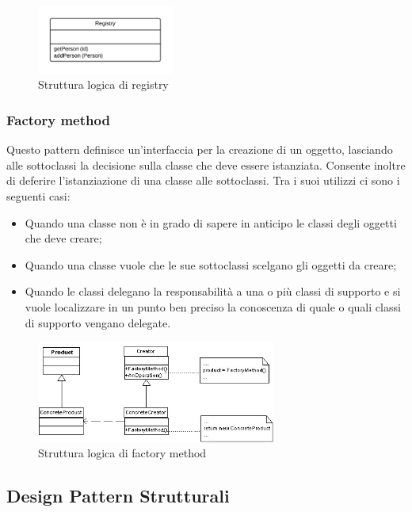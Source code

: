 \begin{figure}[h]
\centering \includegraphics[width=0.4\textwidth]{patterns/registry.png}
\caption{Struttura logica di registry}
\label{fig:factory-method}
\end{figure}

\subsubsection{Factory method}
	
Questo pattern definisce un'interfaccia per la creazione di un oggetto, lasciando alle sottoclassi la decisione sulla classe che deve essere istanziata. Consente inoltre di deferire l'istanziazione di una classe alle sottoclassi. Tra i suoi utilizzi ci sono i seguenti casi:

\begin{itemize}

	\item Quando una classe non è in grado di sapere in anticipo le classi degli oggetti che deve creare;
	\item Quando una classe vuole che le sue sottoclassi scelgano gli oggetti da creare;
	\item Quando le classi delegano la responsabilità a una o più classi di supporto e si vuole localizzare in un punto ben preciso la conoscenza di quale o quali classi di supporto vengano delegate.

\end{itemize}

\begin{figure}[h]
\centering \includegraphics[width=0.7\textwidth]{patterns/factory-method.jpg}
\caption{Struttura logica di factory method}
\end{figure}

\subsection{Design Pattern Strutturali}

